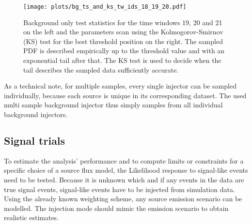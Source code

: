 \begin{figure}[htbp]
  \centering
  \texttt{[image: plots/bg\_ts\_and\_ks\_tw\_ids\_18\_19\_20.pdf]}
  \caption[Background test statistics for the time windows 19, 20 and 21]{
    Background only test statistics for the time windows 19, 20 and 21 on the left and the parameters scan using the Kolmogorov-Smirnov (KS) test for the best threshold position on the right.
    The sampled PDF is described empirically up to the threshold value and with an exponential tail after that.
    The KS test is used to decide when the tail describes the sampled data sufficiently accurate.
  }
  \label{fig:bg_ts_and_ks_tw_ids_18_19_20}
\end{figure}


As a technical note, for multiple samples, every single injector can be sampled individually, because each source is unique in its corresponding dataset.
The used multi sample background injector thus simply samples from all individual background injectors.

\subsection*{Signal trials}
To estimate the analysis' performance and to compute limits or constraints for a specific choice of a source flux model, the Likelihood response to signal-like events need to be tested.
Because it is unknown which and if any events in the data are true signal events, signal-like events have to be injected from simulation data.
Using the already known weighting scheme, any source emission scenario can be modelled.
The injection mode should mimic the emission scenario to obtain realistic estimates.

